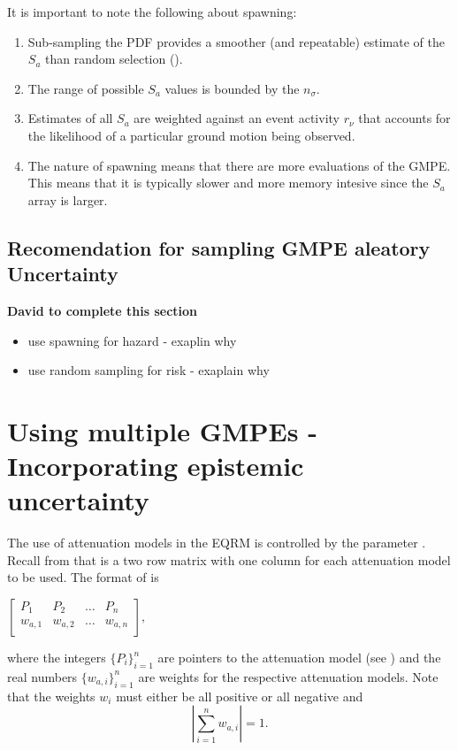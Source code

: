 It is important to note the following about spawning:
\begin{enumerate}
\item Sub-sampling the PDF provides a smoother (and repeatable)
estimate of the $S_a$ than random selection
(). \item The range of possible $S_a$
values is bounded by the $n_\sigma$. \item Estimates of all $S_a$
are weighted against an event activity $r_\nu$ that accounts for the
likelihood of a particular ground motion being observed. \item The
nature of spawning means that there are more evaluations of the
GMPE. This means that it is typically slower and more memory
intesive since the $S_a$ array is larger.
\end{enumerate}




\subsection{Recomendation for sampling GMPE aleatory Uncertainty}

\textbf{David to complete this section}
\begin{itemize}
\item use spawning for hazard - exaplin why
\item use random sampling for risk - exaplain why
\end{itemize}

\section{Using multiple GMPEs - Incorporating epistemic uncertainty}
\label{sec:attn-multi-attnmodels}

The use of attenuation models in the EQRM is controlled by the
 parameter .
Recall from  that
 is a two row matrix with one column
for each attenuation model to be used. The format of
 is
\begin{center}
\begin{math}
 \left[ \begin{array}{ccccc}
P_1 & P_2 &  \hdots & P_n \\
w_{a,1} & w_{a,2} &  \hdots & w_{a,n} \\
\end{array} \right],
\end{math}
\end{center}
where the integers $\{P_i\}_{i=1}^n$ are pointers to the attenuation
model (see ) and the real numbers
$\{w_{a,i}\}_{i=1}^n$ are weights for the respective attenuation
models. Note that the weights $w_i$ must either be all positive or
all negative and
\begin{equation}
\left|\sum_{i=1}^{n}w_{a,i}\right| = 1.
\end{equation}



